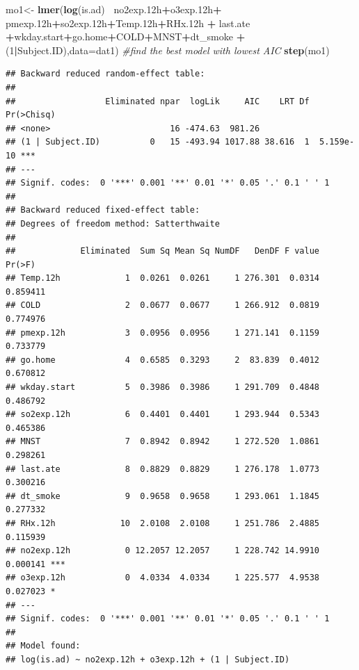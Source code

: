\documentclass[12pt,]{article}
\newenvironment{Shaded}{\begin{snugshade}}{\end{snugshade}}
\newcommand{\CommentTok}[1]{\textcolor[rgb]{0.56,0.35,0.01}{\textit{#1}}}
\newcommand{\DataTypeTok}[1]{\textcolor[rgb]{0.13,0.29,0.53}{#1}}
\newcommand{\DecValTok}[1]{\textcolor[rgb]{0.00,0.00,0.81}{#1}}
\newcommand{\FloatTok}[1]{\textcolor[rgb]{0.00,0.00,0.81}{#1}}
\newcommand{\KeywordTok}[1]{\textcolor[rgb]{0.13,0.29,0.53}{\textbf{#1}}}
\newcommand{\NormalTok}[1]{#1}
\newcommand{\OperatorTok}[1]{\textcolor[rgb]{0.81,0.36,0.00}{\textbf{#1}}}
\newcommand{\StringTok}[1]{\textcolor[rgb]{0.31,0.60,0.02}{#1}}
\begin{document}
\begin{Shaded}
\begin{Highlighting}[]
\NormalTok{mo1<-}\StringTok{ }\KeywordTok{lmer}\NormalTok{(}\KeywordTok{log}\NormalTok{(is.ad) }\OperatorTok{~}\NormalTok{no2exp}\FloatTok{.12}\NormalTok{h}\OperatorTok{+}\NormalTok{o3exp}\FloatTok{.12}\NormalTok{h}\OperatorTok{+}\StringTok{ }\NormalTok{pmexp}\FloatTok{.12}\NormalTok{h}\OperatorTok{+}\NormalTok{so2exp}\FloatTok{.12}\NormalTok{h}\OperatorTok{+}\NormalTok{Temp}\FloatTok{.12}\NormalTok{h}\OperatorTok{+}\NormalTok{RHx}\FloatTok{.12}\NormalTok{h }\OperatorTok{+}\StringTok{ }\NormalTok{last.ate }\OperatorTok{+}\NormalTok{wkday.start}\OperatorTok{+}\NormalTok{go.home}\OperatorTok{+}\NormalTok{COLD}\OperatorTok{+}\NormalTok{MNST}\OperatorTok{+}\NormalTok{dt_smoke }\OperatorTok{+}\NormalTok{(}\DecValTok{1}\OperatorTok{|}\NormalTok{Subject.ID),}\DataTypeTok{data=}\NormalTok{dat1)}
\CommentTok{#find the best model with lowest AIC}
\KeywordTok{step}\NormalTok{(mo1)}
\end{Highlighting}
\end{Shaded}

\begin{verbatim}
## Backward reduced random-effect table:
## 
##                  Eliminated npar  logLik     AIC    LRT Df Pr(>Chisq)    
## <none>                        16 -474.63  981.26                         
## (1 | Subject.ID)          0   15 -493.94 1017.88 38.616  1  5.159e-10 ***
## ---
## Signif. codes:  0 '***' 0.001 '**' 0.01 '*' 0.05 '.' 0.1 ' ' 1
## 
## Backward reduced fixed-effect table:
## Degrees of freedom method: Satterthwaite 
## 
##             Eliminated  Sum Sq Mean Sq NumDF   DenDF F value   Pr(>F)    
## Temp.12h             1  0.0261  0.0261     1 276.301  0.0314 0.859411    
## COLD                 2  0.0677  0.0677     1 266.912  0.0819 0.774976    
## pmexp.12h            3  0.0956  0.0956     1 271.141  0.1159 0.733779    
## go.home              4  0.6585  0.3293     2  83.839  0.4012 0.670812    
## wkday.start          5  0.3986  0.3986     1 291.709  0.4848 0.486792    
## so2exp.12h           6  0.4401  0.4401     1 293.944  0.5343 0.465386    
## MNST                 7  0.8942  0.8942     1 272.520  1.0861 0.298261    
## last.ate             8  0.8829  0.8829     1 276.178  1.0773 0.300216    
## dt_smoke             9  0.9658  0.9658     1 293.061  1.1845 0.277332    
## RHx.12h             10  2.0108  2.0108     1 251.786  2.4885 0.115939    
## no2exp.12h           0 12.2057 12.2057     1 228.742 14.9910 0.000141 ***
## o3exp.12h            0  4.0334  4.0334     1 225.577  4.9538 0.027023 *  
## ---
## Signif. codes:  0 '***' 0.001 '**' 0.01 '*' 0.05 '.' 0.1 ' ' 1
## 
## Model found:
## log(is.ad) ~ no2exp.12h + o3exp.12h + (1 | Subject.ID)
\end{verbatim}
\end{document}
